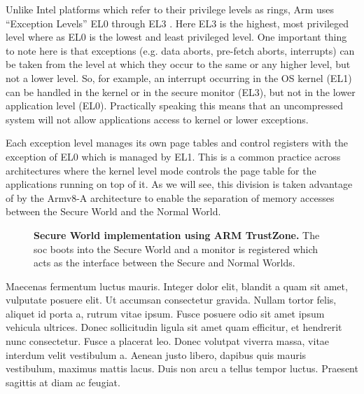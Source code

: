 Unlike Intel platforms which refer to their privilege levels as rings, Arm uses ``Exception Levels'' EL0 through EL3 \cite{ArmV8Fund}. Here EL3 is the highest, most privileged level where as EL0 is the lowest and least privileged level. One important thing to note here is that exceptions (e.g. data aborts, pre-fetch aborts, interrupts) can be taken from the level at which they occur to the same or any higher level, but not a lower level. So, for example, an interrupt occurring in the OS kernel (EL1) can be handled in the kernel or in the secure monitor (EL3), but not in the lower application level (EL0). Practically speaking this means that an uncompressed system will not allow applications access to kernel or lower exceptions.

Each exception level manages its own page tables and control registers with the exception of EL0 which is managed by EL1. This is a common practice across architectures where the kernel level mode controls the page table for the applications running on top of it. As we will see, this division is taken advantage of by the Armv8-A architecture to enable the separation of memory accesses between the Secure World and the Normal World.

\begin{figure}[htbp]
\makebox[\textwidth][c]{
}\caption[Arm TrustZone Example of Normal and Secure World]{\textbf{Secure World implementation using ARM TrustZone.}
The \gls{soc} boots into the Secure World and a monitor is registered which acts as the interface between the Secure and Normal Worlds.
\label{fig:trustzone}}
\end{figure}

Maecenas fermentum luctus mauris. Integer dolor elit, blandit a quam sit amet, vulputate posuere elit. Ut accumsan consectetur gravida. Nullam tortor felis, aliquet id porta a, rutrum vitae ipsum. Fusce posuere odio sit amet ipsum vehicula ultrices. Donec sollicitudin ligula sit amet quam efficitur, et hendrerit nunc consectetur. Fusce a placerat leo. Donec volutpat viverra massa, vitae interdum velit vestibulum a. Aenean justo libero, dapibus quis mauris vestibulum, maximus mattis lacus. Duis non arcu a tellus tempor luctus. Praesent sagittis at diam ac feugiat.